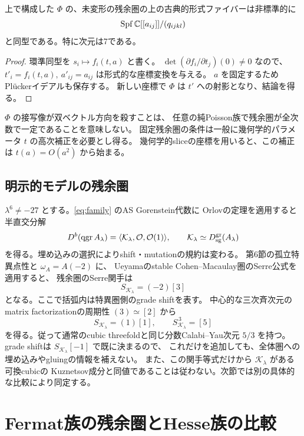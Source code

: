 \begin{theorem}[固定した残余圏の形式ファイバー]\label{thm:fibre}
上で構成した $\Phi$ の、未変形の残余圏の上の古典的形式ファイバーは非標準的に
\[
 \operatorname{Spf}\mathbb C[[a_{ij}]]/(q_{ijkl})
\]
と同型である。特に次元は7である。
\end{theorem}

\begin{proof}
環準同型を $s_i\mapsto f_i(t,a)$ と書く。
$\det(\partial f_i/\partial t_j)(0)\ne0$ なので、
$t'_i=f_i(t,a),\ a'_{ij}=a_{ij}$ は形式的な座標変換を与える。
$a$ を固定するためPlückerイデアルも保存する。
新しい座標で $\Phi$ は $t'$ への射影となり、結論を得る。
\end{proof}

$\Phi$ の接写像が双ベクトル方向を殺すことは、
任意の純Poisson族で残余圏が全次数で一定であることを意味しない。
固定残余圏の条件は一般に幾何学的パラメータ $t$ の高次補正を必要とし得る。
幾何学的sliceの座標を用いると、この補正は $t(a)=O(a^2)$ から始まる。

\subsection{明示的モデルの残余圏}

$\lambda^6\ne-27$ とする。\eqref{eq:family} のAS Gorenstein代数に
Orlovの定理\cite[Theorem 2.5]{Orlov}を適用すると半直交分解
\[
 D^b(\operatorname{qgr} A_\lambda)
 =\langle\mathcal K_\lambda,\mathcal O,\mathcal O(1)\rangle,\qquad
 \mathcal K_\lambda\simeq D_{\mathrm{sg}}^{\mathrm{gr}}(A_\lambda)
\]
を得る。埋め込みの選択によりshift・mutationの規約は変わる。
第6節の孤立特異点性と $\omega_A=A(-2)$ に、
Ueyamaのstable Cohen--Macaulay圏のSerre公式\cite{Ueyama}を適用すると、
残余圏のSerre関手は
\[
 S_{\mathcal K_\lambda}=(-2)[3]
\]
となる。ここで括弧内は特異圏側のgrade shiftを表す。
中心的な三次斉次元のmatrix factorizationの周期性 $(3)\simeq[2]$ から
\[
 S_{\mathcal K_\lambda}=(1)[1],\qquad
 \boxed{S_{\mathcal K_\lambda}^{\,3}=[5]}
\]
を得る。従って通常のcubic threefoldと同じ分数Calabi--Yau次元 $5/3$ を持つ。
grade shiftは $S_{\mathcal K_\lambda}[-1]$ で既に決まるので、
これだけを追加しても、全体圏への埋め込みやgluingの情報を補えない。
また、この関手等式だけから $\mathcal K_\lambda$ がある可換cubicの
Kuznetsov成分と同値であることは従わない。次節では別の具体的な比較により同定する。

\section{Fermat族の残余圏とHesse族の比較}


